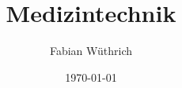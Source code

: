 \titlehead{Hochschule Luzern \\ 
	Technik \& Architektur}
\subject{Zusammenfassung}
\title{Medizintechnik}
\subtitle{}
\author{Fabian Wüthrich}
\date{\today}

\maketitle